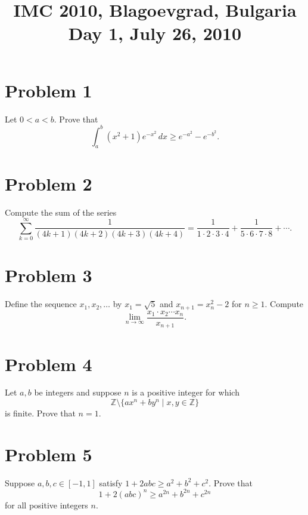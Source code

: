 \documentclass{article}
\title{IMC 2010, Blagoevgrad, Bulgaria \\ Day 1, July 26, 2010}
\date{}
\begin{document}
\maketitle

\section*{Problem 1}
Let $0 < a < b$. Prove that
\[
\int_a^b (x^2 + 1) e^{-x^2} \, dx \ge e^{-a^2} - e^{-b^2}.
\]

\section*{Problem 2}
Compute the sum of the series
\[
\sum_{k=0}^\infty \frac{1}{(4k+1)(4k+2)(4k+3)(4k+4)} = \frac{1}{1 \cdot 2 \cdot 3 \cdot 4} + \frac{1}{5 \cdot 6 \cdot 7 \cdot 8} + \cdots.
\]

\section*{Problem 3}
Define the sequence $x_1, x_2, \ldots$ by $x_1 = \sqrt{5}$ and $x_{n+1} = x_n^2 - 2$ for $n \ge 1$. Compute
\[
\lim_{n \to \infty} \frac{x_1 \cdot x_2 \cdots x_n}{x_{n+1}}.
\]

\section*{Problem 4}
Let $a, b$ be integers and suppose $n$ is a positive integer for which
\[
\mathbb{Z} \setminus \{ a x^n + b y^n \mid x, y \in \mathbb{Z} \}
\]
is finite. Prove that $n = 1$.

\section*{Problem 5}
Suppose $a, b, c \in [-1, 1]$ satisfy $1 + 2abc \ge a^2 + b^2 + c^2$. Prove that
\[
1 + 2(abc)^n \ge a^{2n} + b^{2n} + c^{2n}
\]
for all positive integers $n$.
\end{document}
